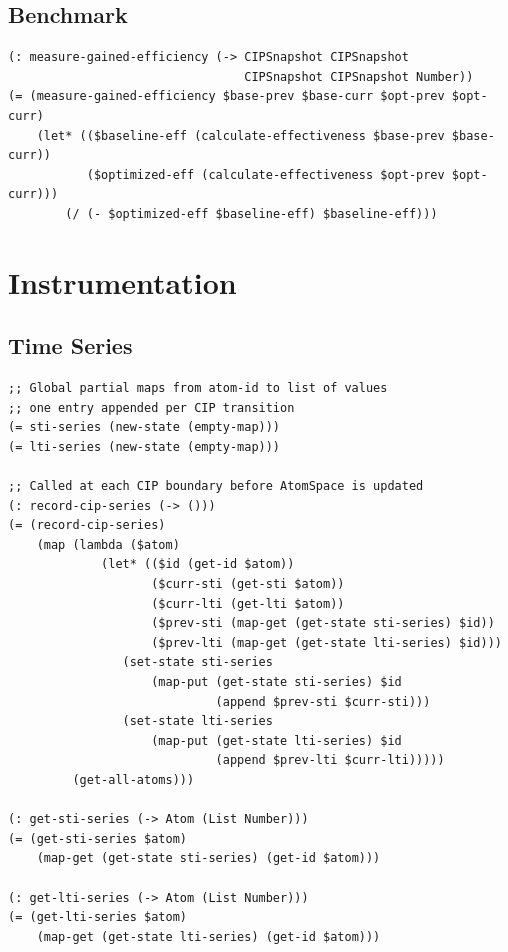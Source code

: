 \documentclass[11pt]{article}
\theoremstyle{definition}
\begin{document}
\subsection{Benchmark}

\begin{lstlisting}[style=metta, caption=Gained Efficiency]
(: measure-gained-efficiency (-> CIPSnapshot CIPSnapshot
                                 CIPSnapshot CIPSnapshot Number))
(= (measure-gained-efficiency $base-prev $base-curr $opt-prev $opt-curr)
    (let* (($baseline-eff (calculate-effectiveness $base-prev $base-curr))
           ($optimized-eff (calculate-effectiveness $opt-prev $opt-curr)))
        (/ (- $optimized-eff $baseline-eff) $baseline-eff)))
\end{lstlisting}

\clearpage
\section{Instrumentation}

\subsection{Time Series}

\begin{lstlisting}[style=metta, caption=STI/LTI Time Series]
;; Global partial maps from atom-id to list of values
;; one entry appended per CIP transition
(= sti-series (new-state (empty-map)))
(= lti-series (new-state (empty-map)))

;; Called at each CIP boundary before AtomSpace is updated
(: record-cip-series (-> ()))
(= (record-cip-series)
    (map (lambda ($atom)
             (let* (($id (get-id $atom))
                    ($curr-sti (get-sti $atom))
                    ($curr-lti (get-lti $atom))
                    ($prev-sti (map-get (get-state sti-series) $id))
                    ($prev-lti (map-get (get-state lti-series) $id)))
                (set-state sti-series
                    (map-put (get-state sti-series) $id
                             (append $prev-sti $curr-sti)))
                (set-state lti-series
                    (map-put (get-state lti-series) $id
                             (append $prev-lti $curr-lti)))))
         (get-all-atoms)))

(: get-sti-series (-> Atom (List Number)))
(= (get-sti-series $atom)
    (map-get (get-state sti-series) (get-id $atom)))

(: get-lti-series (-> Atom (List Number)))
(= (get-lti-series $atom)
    (map-get (get-state lti-series) (get-id $atom)))
\end{lstlisting}
\end{document}
